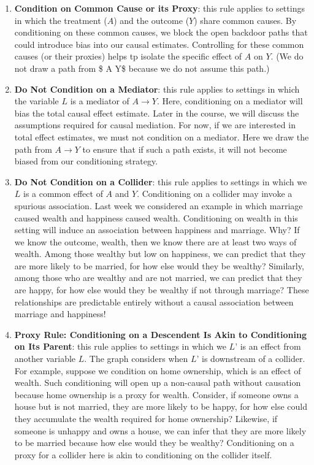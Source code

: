 \documentclass[
  single column]{article}
\begin{document}
\begin{enumerate}
\def\labelenumi{\arabic{enumi}.}
\item
  \textbf{Condition on Common Cause or its Proxy}: this rule applies to
  settings in which the treatment (\(A\)) and the outcome (\(Y\)) share
  common causes. By conditioning on these common causes, we block the
  open backdoor paths that could introduce bias into our causal
  estimates. Controlling for these common causes (or their proxies)
  helps tp isolate the specific effect of \(A\) on \(Y\). (We do not
  draw a path from \$ A \to Y\$ because we do not assume this path.)
\item
  \textbf{Do Not Condition on a Mediator}: this rule applies to settings
  in which the variable \(L\) is a mediator of \(A \to Y\). Here,
  conditioning on a mediator will bias the total causal effect estimate.
  Later in the course, we will discuss the assumptions required for
  causal mediation. For now, if we are interested in total effect
  estimates, we must not condition on a mediator. Here we draw the path
  from \(A \to Y\) to ensure that if such a path exists, it will not
  become biased from our conditioning strategy.
\item
  \textbf{Do Not Condition on a Collider}: this rule applies to settings
  in which we \(L\) is a common effect of \(A\) and \(Y\). Conditioning
  on a collider may invoke a spurious association. Last week we
  considered an example in which marriage caused wealth and happiness
  caused wealth. Conditioning on wealth in this setting will induce an
  association between happiness and marriage. Why? If we know the
  outcome, wealth, then we know there are at least two ways of wealth.
  Among those wealthy but low on happiness, we can predict that they are
  more likely to be married, for how else would they be wealthy?
  Similarly, among those who are wealthy and are not married, we can
  predict that they are happy, for how else would they be wealthy if not
  through marriage? These relationships are predictable entirely without
  a causal association between marriage and happiness!
\item
  \textbf{Proxy Rule: Conditioning on a Descendent Is Akin to
  Conditioning on Its Parent}: this rule applies to settings in which we
  \(L’\) is an effect from another variable \(L\). The graph considers
  when \(L’\) is downstream of a collider. For example, suppose we
  condition on home ownership, which is an effect of wealth. Such
  conditioning will open up a non-causal path without causation because
  home ownership is a proxy for wealth. Consider, if someone owns a
  house but is not married, they are more likely to be happy, for how
  else could they accumulate the wealth required for home ownership?
  Likewise, if someone is unhappy and owns a house, we can infer that
  they are more likely to be married because how else would they be
  wealthy? Conditioning on a proxy for a collider here is akin to
  conditioning on the collider itself.
\end{enumerate}
\end{document}
